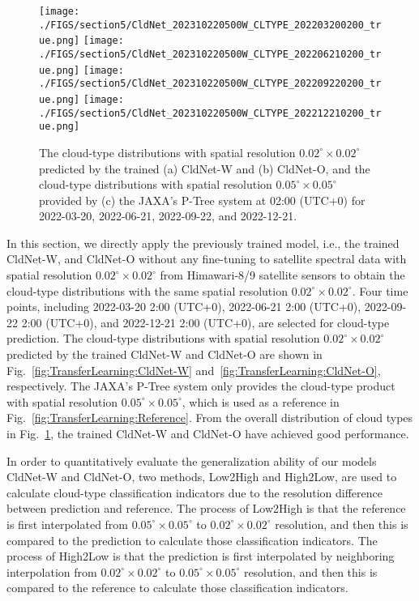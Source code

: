 \documentclass[review]{elsarticle}
\begin{document}
\begin{figure}[!htp]
{\begin{minipage}[b]{\textwidth}
            \centering
            \texttt{[image: ./FIGS/section5/CldNet\_202310220500W\_CLTYPE\_202203200200\_true.png]}
            \texttt{[image: ./FIGS/section5/CldNet\_202310220500W\_CLTYPE\_202206210200\_true.png]}
            \texttt{[image: ./FIGS/section5/CldNet\_202310220500W\_CLTYPE\_202209220200\_true.png]}
            \texttt{[image: ./FIGS/section5/CldNet\_202310220500W\_CLTYPE\_202212210200\_true.png]}
        \end{minipage}
    }
    \caption{The cloud-type distributions with spatial resolution $0.02^{\circ}\times0.02^{\circ}$ predicted by the trained (a) CldNet-W and (b) CldNet-O, and the cloud-type distributions with spatial resolution $0.05^{\circ}\times0.05^{\circ}$ provided by (c) the JAXA's P-Tree system at 02:00 (UTC+0) for 2022-03-20, 2022-06-21, 2022-09-22, and 2022-12-21.}
    \label{fig:TransferLearning}
\end{figure}

In this section, we directly apply the previously trained model, i.e., the trained CldNet-W, and CldNet-O without any fine-tuning to satellite spectral data with spatial resolution $\mathrm{0.02^{\circ}\times0.02^{\circ}}$ from Himawari-8/9 satellite sensors to obtain the cloud-type distributions with the same spatial resolution $\mathrm{0.02^{\circ}\times0.02^{\circ}}$.
Four time points, including 2022-03-20 2:00 (UTC+0), 2022-06-21 2:00 (UTC+0), 2022-09-22 2:00 (UTC+0), and 2022-12-21 2:00 (UTC+0), are selected for cloud-type prediction.
The cloud-type distributions with spatial resolution $\mathrm{0.02^{\circ}\times0.02^{\circ}}$ predicted by the trained CldNet-W and CldNet-O are shown in Fig.~\ref{fig:TransferLearning:CldNet-W} and~\ref{fig:TransferLearning:CldNet-O}, respectively.
The JAXA's P-Tree system only provides the cloud-type product with spatial resolution $\mathrm{0.05^{\circ}\times0.05^{\circ}}$, which is used as a reference in Fig.~\ref{fig:TransferLearning:Reference}.
From the overall distribution of cloud types in Fig.~\ref{fig:TransferLearning}, the trained CldNet-W and CldNet-O have achieved good performance.

In order to quantitatively evaluate the generalization ability of our models CldNet-W and CldNet-O, two methods, Low2High and High2Low, are used to calculate cloud-type classification indicators due to the resolution difference between prediction and reference.
The process of Low2High is that the reference is first interpolated from $0.05^{\circ}\times0.05^{\circ}$ to $0.02^{\circ}\times0.02^{\circ}$ resolution, and then this is compared to the prediction to calculate those classification indicators.
The process of High2Low is that the prediction is first interpolated by neighboring interpolation from $0.02^{\circ}\times0.02^{\circ}$ to $0.05^{\circ}\times0.05^{\circ}$ resolution, and then this is compared to the reference to calculate those classification indicators.
\end{document}
